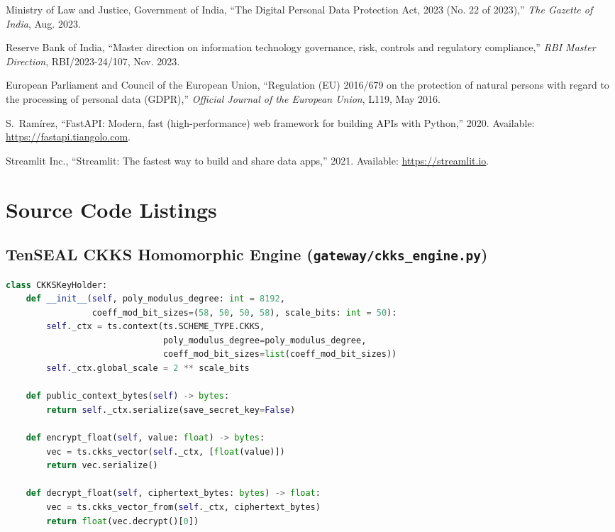 \documentclass[12pt,a4paper,oneside]{report}
\numberwithin{equation}{chapter}
\begin{document}
\begin{thebibliography}{99}
Ministry of Law and Justice, Government of India, ``The Digital Personal Data Protection Act, 2023 (No. 22 of 2023),'' \emph{The Gazette of India}, Aug. 2023.

Reserve Bank of India, ``Master direction on information technology governance, risk, controls and regulatory compliance,'' \emph{RBI Master Direction}, RBI/2023-24/107, Nov. 2023.

European Parliament and Council of the European Union, ``Regulation (EU) 2016/679 on the protection of natural persons with regard to the processing of personal data (GDPR),'' \emph{Official Journal of the European Union}, L119, May 2016.

S.~Ram\'irez, ``FastAPI: Modern, fast (high-performance) web framework for building APIs with Python,'' 2020. Available: \url{https://fastapi.tiangolo.com}.

Streamlit Inc., ``Streamlit: The fastest way to build and share data apps,'' 2021. Available: \url{https://streamlit.io}.

\end{thebibliography}

\appendix
\chapter{Source Code Listings}

\section{TenSEAL CKKS Homomorphic Engine (\texttt{gateway/ckks\_engine.py})}
\begin{lstlisting}[language=Python]
class CKKSKeyHolder:
    def __init__(self, poly_modulus_degree: int = 8192, 
                 coeff_mod_bit_sizes=(58, 50, 50, 58), scale_bits: int = 50):
        self._ctx = ts.context(ts.SCHEME_TYPE.CKKS, 
                               poly_modulus_degree=poly_modulus_degree,
                               coeff_mod_bit_sizes=list(coeff_mod_bit_sizes))
        self._ctx.global_scale = 2 ** scale_bits

    def public_context_bytes(self) -> bytes:
        return self._ctx.serialize(save_secret_key=False)

    def encrypt_float(self, value: float) -> bytes:
        vec = ts.ckks_vector(self._ctx, [float(value)])
        return vec.serialize()

    def decrypt_float(self, ciphertext_bytes: bytes) -> float:
        vec = ts.ckks_vector_from(self._ctx, ciphertext_bytes)
        return float(vec.decrypt()[0])
\end{lstlisting}
\end{document}
